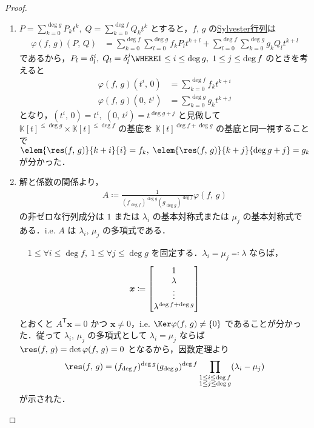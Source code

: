 \documentclass[TQFT_main]{subfiles}
\begin{document}
\begin{proof}
    \begin{enumerate}
        \item $P = \sum_{k=0}^{\deg g} P_k t^k,\; Q = \sum_{k=0}^{\deg f} Q_k t^{k}$ とすると，$f,\, g$ の\hyperref[def:resultant]{Sylvester行列}は
        \begin{align}
            \varphi(f,\, g)(P,\, Q)
            &= \sum_{k = 0}^{\deg f}\sum_{l = 0}^{\deg g} f_k P_{l} t^{k+l} + \sum_{l = 0}^{\deg f}\sum_{k = 0}^{\deg g} g_k Q_{l} t^{k + l}
        \end{align}
        であるから，$P_l = \delta_l^i,\; Q_l = \delta_l^{j} \WHERE 1 \le i \le \deg g,\; 1 \le j \le \deg f$ のときを考えると
        \begin{align}
            \varphi(f,\, g)(t^i,\, 0) 
            &= \sum_{k=0}^{\deg f} f_k t^{k+i} \\
            \varphi(f,\, g)(0,\, t^{j})
            &= \sum_{k=0}^{\deg g} g_k t^{k + j}
        \end{align}
        となり，$(t^i,\, 0) = t^i,\; (0,\, t^j) = t^{\deg g + j}$ と見做して $ \mathbb{K}[t]^{\le \deg g} \times \mathbb{K}[t]^{\le \deg f}$ の基底を $\mathbb{K}[t]^{\deg f + \deg g}$ の基底と同一視することで $\elem{\res (f,\, g)}{k+i}{i} = f_k,\; \elem{\res (f,\, g)}{k + j}{\deg g + j} = g_k$ が分かった．

        \item 解と係数の関係より，
        \begin{align}
            A \coloneqq \frac{1}{(f_{\deg f})^{\deg g} (g_{\deg g})^{\deg f}} \varphi(f,\, g)
        \end{align}
        の非ゼロな行列成分は $1$ または $\lambda_i$ の基本対称式または $\mu_j$ の基本対称式である．i.e. $A$ は $\lambda_i,\, \mu_j$ の多項式である．
        
        　$1\le \forall i \le \deg f,\; 1 \le \forall j \le \deg g$ を固定する．$\lambda_i = \mu_j \eqqcolon \lambda$ ならば，
        \begin{align}
            \bm{x} \coloneqq \mqty[1 \\ \lambda \\ \vdots \\ \lambda^{\deg f + \deg g}]
        \end{align}
        とおくと $A^{\mathsf{T}} \bm{x} = 0$ かつ $\bm{x} \neq 0$，i.e. $\Ker \varphi(f,\, g) \neq \{0\}$ であることが分かった．従って $\lambda_i,\, \mu_j$ の多項式として $\lambda_i = \mu_j$ ならば $\res (f,\, g) = \det \varphi(f,\, g) = 0$ となるから，因数定理より
        \begin{align}
            \res (f,\, g) = (f_{\deg f})^{\deg g} (g_{\deg g})^{\deg f} \prod_{\substack{1 \le i \le \deg f \\ 1 \le j \le \deg g}} (\lambda_i - \mu_j)
        \end{align}
        が示された．
        

\end{enumerate}
\end{proof}
\end{document}
